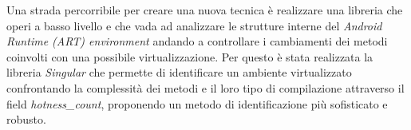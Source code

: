 Una strada percorribile per creare una nuova tecnica è realizzare una libreria che operi a basso livello e che vada ad analizzare le strutture interne del \emph{Android Runtime (ART) environment} andando a controllare i cambiamenti dei metodi coinvolti con una possibile virtualizzazione.
Per questo è stata realizzata la libreria \emph{Singular} che permette di identificare un ambiente virtualizzato confrontando la complessità dei metodi e il loro tipo di compilazione attraverso il field \emph{hotness\_count}, proponendo un metodo di identificazione più sofisticato e robusto.


